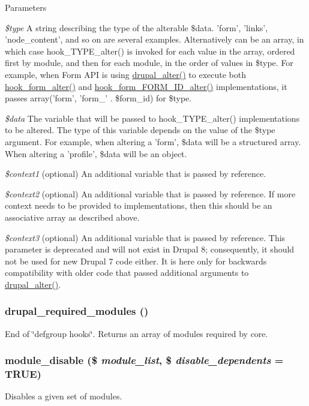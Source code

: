 \begin{DoxyParams}{Parameters}
\item[{\em \$type}]A string describing the type of the alterable \$data. 'form', 'links', 'node\_\-content', and so on are several examples. Alternatively can be an array, in which case hook\_\-TYPE\_\-alter() is invoked for each value in the array, ordered first by module, and then for each module, in the order of values in \$type. For example, when Form API is using \hyperlink{module_8inc_a0a8742a524bbb674b6c6a26755765007}{drupal\_\-alter()} to execute both \hyperlink{group__hooks_ga6df3cea27ae1407aeef4eae5444cb213}{hook\_\-form\_\-alter()} and \hyperlink{group__hooks_ga8d4a4089551493d55911bd5c4f218264}{hook\_\-form\_\-FORM\_\-ID\_\-alter()} implementations, it passes array('form', 'form\_\-' . \$form\_\-id) for \$type. \item[{\em \$data}]The variable that will be passed to hook\_\-TYPE\_\-alter() implementations to be altered. The type of this variable depends on the value of the \$type argument. For example, when altering a 'form', \$data will be a structured array. When altering a 'profile', \$data will be an object. \item[{\em \$context1}](optional) An additional variable that is passed by reference. \item[{\em \$context2}](optional) An additional variable that is passed by reference. If more context needs to be provided to implementations, then this should be an associative array as described above. \item[{\em \$context3}](optional) An additional variable that is passed by reference. This parameter is deprecated and will not exist in Drupal 8; consequently, it should not be used for new Drupal 7 code either. It is here only for backwards compatibility with older code that passed additional arguments to \hyperlink{module_8inc_a0a8742a524bbb674b6c6a26755765007}{drupal\_\-alter()}. \end{DoxyParams}
\hypertarget{module_8inc_a029be29693701bd21b6810e8d047c5a8}{
\subsubsection[{drupal\_\-required\_\-modules}]{\setlength{\rightskip}{0pt plus 5cm}drupal\_\-required\_\-modules ()}}
\label{module_8inc_a029be29693701bd21b6810e8d047c5a8}
End of \char`\"{}defgroup hooks\char`\"{}. Returns an array of modules required by core. \hypertarget{module_8inc_a0378d5f56db255c18ca59fc54cd52a94}{
\subsubsection[{module\_\-disable}]{\setlength{\rightskip}{0pt plus 5cm}module\_\-disable (\$ {\em module\_\-list}, \/  \$ {\em disable\_\-dependents} = {\ttfamily TRUE})}}
\label{module_8inc_a0378d5f56db255c18ca59fc54cd52a94}
Disables a given set of modules.


